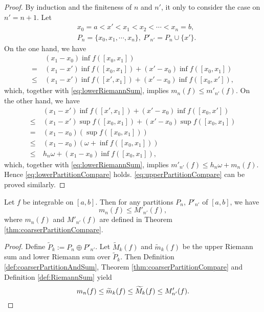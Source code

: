 \begin{proof}
  By induction and the finiteness of $n$ and $n'$,
  it only to consider the case on $n'=n+1$. Let
  \begin{align*}
    &\ x_{0}=a<x'<x_{1}<x_{2}<\cdots<x_{n}=b,\\
    &\ P_{n}=\{x_{0},x_{1},\cdots,x_{n}\},\ P'_{n'}=P_{n}\cup \{x'\}. 
  \end{align*}
  On the one hand, we have
  \begin{align*}
    &\ (x_{1}-x_{0})\inf f([x_{0},x_{1}])\\
    = &\ (x_{1}-x')\inf f([x_{0},x_{1}])+(x'-x_{0})\inf f([x_{0},x_{1}])\\
    \le &\ (x_{1}-x')\inf f([x',x_{1}])+(x'-x_{0})\inf f([x_{0},x']),
  \end{align*}
  which, together with \eqref{eq:lowerRiemannSum}, implies
  $m_{n}(f)\le m'_{n'}(f)$. On the other hand, we have
  \begin{align*}
    &\ (x_{1}-x')\inf f([x',x_{1}])+(x'-x_{0})\inf f([x_{0},x'])
    \\
    \le &\ (x_{1}-x')\sup f([x_{0},x_{1}])+(x'-x_{0})\sup f([x_{0},x_{1}])
          \\
    = &\ (x_{1}-x_{0})(\sup f([x_{0},x_{1}]))\\
    \le &\  (x_{1}-x_{0})(\omega+\inf f([x_{0},x_{1}]))\\
    \le &\ h_{n}\omega+(x_{1}-x_{0})\inf f([x_{0},x_{1}]),
  \end{align*}
  which, together with \eqref{eq:lowerRiemannSum}, implies
  $ m'_{n'}(f)\le h_{n}\omega+m_{n}(f). $ Hence
  \eqref{eq:lowerPartitionCompare} holds.
  \eqref{eq:upperPartitionCompare} can be proved similarly. 
\end{proof}

\begin{thm}
  \label{thm:partitionSumCompare}
  Let $f$ be integrable on $[a,b]$.
  Then for any partitions $P_{n}$, $P'_{n'}$ of $[a,b]$, we have
  \begin{equation}
    \label{eq:partitionSumCompare}
    m_{n}(f)\le M'_{n'}(f),
  \end{equation}
  where $m_{n}(f)$ and $M'_{n'}(f)$ are defined in
  Theorem \ref{thm:coarserPartitionCompare}.
\end{thm}
\begin{proof}
  Define $\widetilde{P}_{k}:=P_{n}\oplus P'_{n'}$. Let
  $\widetilde{M}_{k}(f)$ and $\widetilde{m}_{k}(f)$ be the upper Riemann sum
  and lower Riemann sum over $\widetilde{P}_{k}$. Then
  Definition \ref{def:coarserPartitionAndSum},
  Theorem \ref{thm:coarserPartitionCompare}
  and Definition \ref{def:RiemannSum} yield
  \begin{displaymath}
    m_{n}(f)\le \widetilde{m}_{k}(f)\le
    \widetilde{M}_{k}(f)\le M'_{n'}(f).
    \qedhere
  \end{displaymath}
\end{proof}

